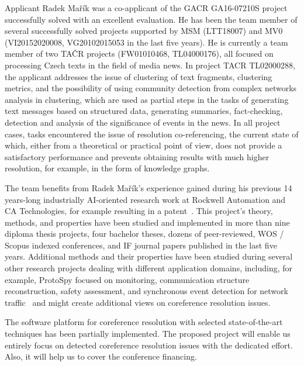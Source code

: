 Applicant Radek Mařík was a co-applicant of the GACR GA16-07210S project successfully solved with an excellent evaluation. He has been the team member of several successfully solved projects supported by MSM (LTT18007) and MV0 (VI20152020008, VG20102015053 in the last five years). He is currently a team member of two TAČR projects (FW01010468, TL04000176), all focused on processing Czech texts in the field of media news. In project TACR TL02000288, the applicant addresses the issue of clustering of text fragments, clustering metrics, and the possibility of using community detection from complex networks analysis in clustering, which are used as partial steps in the tasks of generating text messages based on structured data, generating summaries, fact-checking, detection and analysis of the significance of events in the news. In all project cases, tasks encountered the issue of resolution co-referencing, the current state of which, either from a theoretical or practical point of view, does not provide a satisfactory performance and prevents obtaining results with much higher resolution, for example, in the form of knowledge graphs.

The team benefits from Radek Mařík's experience gained during his previous 14 years-long industrially AI-oriented research work at Rockwell Automation and CA Technologies, for example resulting in a patent~\cite{Marik2011}. This project's theory, methods, and properties have been studied and implemented in more than nine diploma thesis projects, four bachelor theses, dozens of peer-reviewed, WOS / Scopus indexed conferences, and IF journal papers published in the last five years. Additional methods and their properties have been studied during several other research projects dealing with different application domains, including, for example, ProtoSpy focused on monitoring, communication structure reconstruction, safety assessment, and synchronous event detection for network traffic~\cite{Marik2015b,Marik2014a} and might create additional views on coreference resolution issues. 

The software platform for coreference resolution with selected state-of-the-art techniques has been partially implemented. The proposed project will enable us entirely focus on detected coreference resolution issues with the dedicated effort. Also, it will help us to cover the conference financing.  

